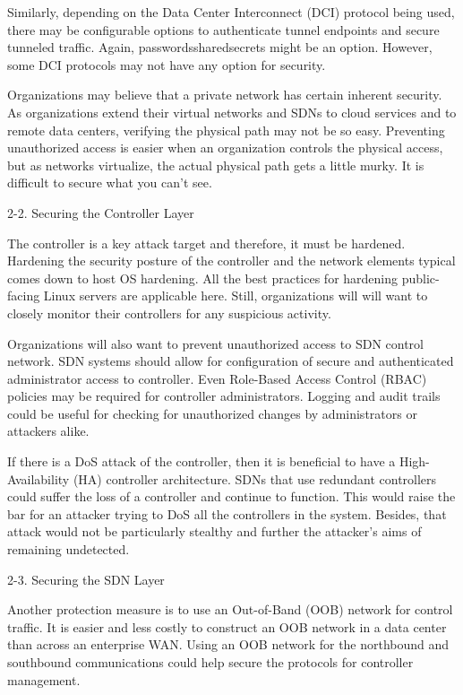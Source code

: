 Similarly, depending on the Data Center Interconnect (DCI) protocol being used, there may be configurable options to authenticate tunnel endpoints and secure tunneled traffic. Again, passwords\/shared\-secrets might be an option.  However, some DCI protocols may not have any option for security.

Organizations may believe that a private network has certain inherent security.  As organizations extend their virtual networks and SDNs to cloud services and to remote data centers, verifying the physical path may not be so easy.  Preventing unauthorized access is easier when an organization controls the physical access, but as networks virtualize, the actual physical path gets a little murky.  It is difficult to secure what you can’t see.

2-2. Securing the Controller Layer

The controller is a key attack target and therefore, it must be hardened.  Hardening the security posture of the controller and the network elements typical comes down to host OS hardening.  All the best practices for hardening public-facing Linux servers are applicable here.  Still, organizations will will want to closely monitor their controllers for any suspicious activity.

Organizations will also want to prevent unauthorized access to SDN control network.  SDN systems should allow for configuration of secure and authenticated administrator access to controller.  Even Role-Based Access Control (RBAC) policies may be required for controller administrators.  Logging and audit trails could be useful for checking for unauthorized changes by administrators or attackers alike.

If there is a DoS attack of the controller, then it is beneficial to have a High-Availability (HA) controller architecture.  SDNs that use redundant controllers could suffer the loss of a controller and continue to function.  This would raise the bar for an attacker trying to DoS all the controllers in the system.  Besides, that attack would not be particularly stealthy and further the attacker’s aims of remaining undetected.

2-3. Securing the SDN Layer

Another protection measure is to use an Out-of-Band (OOB) network for control traffic.  It is easier and less costly to construct an OOB network in a data center than across an enterprise WAN.  Using an OOB network for the northbound and southbound communications could help secure the protocols for controller management.

